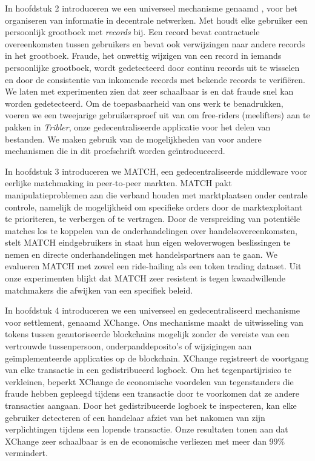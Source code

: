 {In hoofdstuk 2 introduceren we een universeel mechanisme genaamd \emph{\TrustChain{}}, voor het organiseren van informatie in decentrale netwerken.
Met \emph{\TrustChain{}} houdt elke gebruiker een persoonlijk grootboek met \emph{records} bij.
Een record bevat contractuele overeenkomsten tussen gebruikers en bevat ook verwijzingen naar andere records in het grootboek.
Fraude, het onwettig wijzigen van een record in iemands persoonlijke grootboek, wordt gedetecteerd door continu records uit te wisselen en door de consistentie van inkomende records met bekende records te verifiëren.
We laten met experimenten zien dat \emph{\TrustChain{}} zeer schaalbaar is en dat fraude snel kan worden gedetecteerd.
Om de toepasbaarheid van ons werk te benadrukken, voeren we een tweejarige gebruikersproef uit van \emph{\TrustChain{}} om free-riders (meelifters) aan te pakken in \emph{Tribler}, onze gedecentraliseerde applicatie voor het delen van bestanden.
We maken gebruik van de mogelijkheden van \emph{\TrustChain{}} voor andere mechanismen die in dit proefschrift worden geïntroduceerd.

In hoofdstuk 3 introduceren we MATCH, een gedecentraliseerde middleware voor eerlijke matchmaking in peer-to-peer markten.
MATCH pakt manipulatieproblemen aan die verband houden met marktplaatsen onder centrale controle, namelijk de mogelijkheid om specifieke orders door de marktexploitant te prioriteren, te verbergen of te vertragen.
Door de verspreiding van potentiële matches los te koppelen van de onderhandelingen over handelsovereenkomsten, stelt MATCH eindgebruikers in staat hun eigen weloverwogen beslissingen te nemen en directe onderhandelingen met handelspartners aan te gaan.
We evalueren MATCH met zowel een ride-hailing als een token trading dataset.
Uit onze experimenten blijkt dat MATCH zeer resistent is tegen kwaadwillende matchmakers die afwijken van een specifiek beleid.

In hoofdstuk 4 introduceren we een universeel en gedecentraliseerd mechanisme voor settlement, genaamd XChange.
Ons mechanisme maakt de uitwisseling van tokens tussen geautoriseerde blockchains mogelijk zonder de vereiste van een vertrouwde tussenpersoon, onderpanddeposito's of wijzigingen aan geïmplementeerde applicaties op de blockchain.
XChange registreert de voortgang van elke transactie in een gedistribueerd logboek.
Om het tegenpartijrisico te verkleinen, beperkt XChange de economische voordelen van tegenstanders die fraude hebben gepleegd tijdens een transactie door te voorkomen dat ze andere transacties aangaan.
Door het gedistribueerde logboek te inspecteren, kan elke gebruiker detecteren of een handelaar afziet van het nakomen van zijn verplichtingen tijdens een lopende transactie.
Onze resultaten tonen aan dat XChange zeer schaalbaar is en de economische verliezen met meer dan 99\% vermindert.

}
